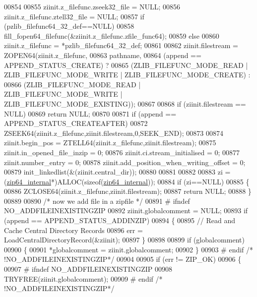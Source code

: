\begin{DoxyCode}
00854 
00855     ziinit.z\_filefunc.zseek32\_file = NULL;
00856     ziinit.z\_filefunc.ztell32\_file = NULL;
00857     \textcolor{keywordflow}{if} (pzlib\_filefunc64\_32\_def==NULL)
00858         fill\_fopen64\_filefunc(&ziinit.z\_filefunc.zfile\_func64);
00859     \textcolor{keywordflow}{else}
00860         ziinit.z\_filefunc = *pzlib\_filefunc64\_32\_def;
00861 
00862     ziinit.filestream = ZOPEN64(ziinit.z\_filefunc,
00863                   pathname,
00864                   (append == APPEND\_STATUS\_CREATE) ?
00865                   (ZLIB\_FILEFUNC\_MODE\_READ | ZLIB\_FILEFUNC\_MODE\_WRITE | ZLIB\_FILEFUNC\_MODE\_CREATE) :
00866                     (ZLIB\_FILEFUNC\_MODE\_READ | ZLIB\_FILEFUNC\_MODE\_WRITE | ZLIB\_FILEFUNC\_MODE\_EXISTING));
00867 
00868     \textcolor{keywordflow}{if} (ziinit.filestream == NULL)
00869         \textcolor{keywordflow}{return} NULL;
00870 
00871     \textcolor{keywordflow}{if} (append == APPEND\_STATUS\_CREATEAFTER)
00872         ZSEEK64(ziinit.z\_filefunc,ziinit.filestream,0,SEEK\_END);
00873 
00874     ziinit.begin\_pos = ZTELL64(ziinit.z\_filefunc,ziinit.filestream);
00875     ziinit.in\_opened\_file\_inzip = 0;
00876     ziinit.ci.stream\_initialised = 0;
00877     ziinit.number\_entry = 0;
00878     ziinit.add\_position\_when\_writing\_offset = 0;
00879     init\_linkedlist(&(ziinit.central\_dir));
00880 
00881 
00882 
00883     zi = (\hyperlink{structzip64__internal}{zip64\_internal}*)ALLOC(\textcolor{keyword}{sizeof}(\hyperlink{structzip64__internal}{zip64\_internal}));
00884     \textcolor{keywordflow}{if} (zi==NULL)
00885     \{
00886         ZCLOSE64(ziinit.z\_filefunc,ziinit.filestream);
00887         \textcolor{keywordflow}{return} NULL;
00888     \}
00889 
00890     \textcolor{comment}{/* now we add file in a zipfile */}
00891 \textcolor{preprocessor}{#    ifndef NO\_ADDFILEINEXISTINGZIP}
00892     ziinit.globalcomment = NULL;
00893     \textcolor{keywordflow}{if} (append == APPEND\_STATUS\_ADDINZIP)
00894     \{
00895       \textcolor{comment}{// Read and Cache Central Directory Records}
00896       err = LoadCentralDirectoryRecord(&ziinit);
00897     \}
00898 
00899     \textcolor{keywordflow}{if} (globalcomment)
00900     \{
00901       *globalcomment = ziinit.globalcomment;
00902     \}
00903 \textcolor{preprocessor}{#    endif }\textcolor{comment}{/* !NO\_ADDFILEINEXISTINGZIP*/}\textcolor{preprocessor}{}
00904 
00905     \textcolor{keywordflow}{if} (err != ZIP\_OK)
00906     \{
00907 \textcolor{preprocessor}{#    ifndef NO\_ADDFILEINEXISTINGZIP}
00908         TRYFREE(ziinit.globalcomment);
00909 \textcolor{preprocessor}{#    endif }\textcolor{comment}{/* !NO\_ADDFILEINEXISTINGZIP*/}\textcolor{preprocessor}{}

\end{DoxyCode}
